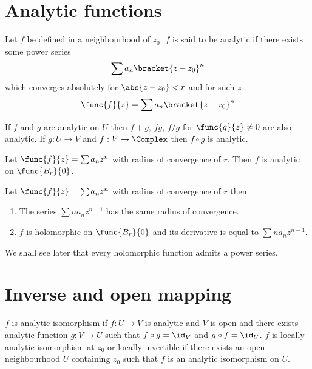 \section{Analytic functions}
Let \(f\) be defined in a neighbourhood of \(z_0\). \(f\) is said to be analytic if there exists some power series 
\begin{equation*}
    \sum a_n \bracket{z - z_0}^n
\end{equation*}
which converges absolutely for \(\abs{z - z_0} < r\) and for such \(z\)
\begin{equation*}
    \func{f}{z} = \sum a_n \bracket{z - z_0}^n
\end{equation*}

\begin{proposition}
    If \(f\) and \(g\) are analytic on \(U\) then \(f+ g\), \(fg\), \(f/g\) for \(\func{g}{z} \neq 0\) are also analytic. If \(g : U \to V\) and \(f : V \to \Complex\) then \(f \circ g\) is analytic.
\end{proposition}

\begin{theorem}
    Let \(\func{f}{z} = \sum a_n z^n\) with radius of convergence of \(r\). Then \(f\) is analytic on \(\func{B_r}{0}\).
\end{theorem}

\begin{theorem}
    Let \(\func{f}{z} = \sum a_n z^n\) with radius of convergence of \(r\) then 
    \begin{enumerate}
        \item The series \(\sum na_n z^{n-1}\) has the same radius of convergence.
        \item \(f\) is holomorphic on \(\func{B_r}{0}\) and its derivative is equal to \(\sum na_n z^{n-1}\).
    \end{enumerate}
\end{theorem}
We shall see later that every holomorphic function admits a power series. 

\section{Inverse and open mapping}
\(f\) is analytic isomorphism if \(f : U \to V\) is analytic and \(V\) is open and there exists analytic function \(g : V \to U\) such that \(f \circ g = \id_V\) and \(g \circ f = \id_U\). \(f\) is locally analytic isomorphism at \(z_0\) or locally invertible if there exists an open neighbourhood \(U\) containing \(z_0\) such that \(f\) is an analytic isomorphism on \(U\). 

